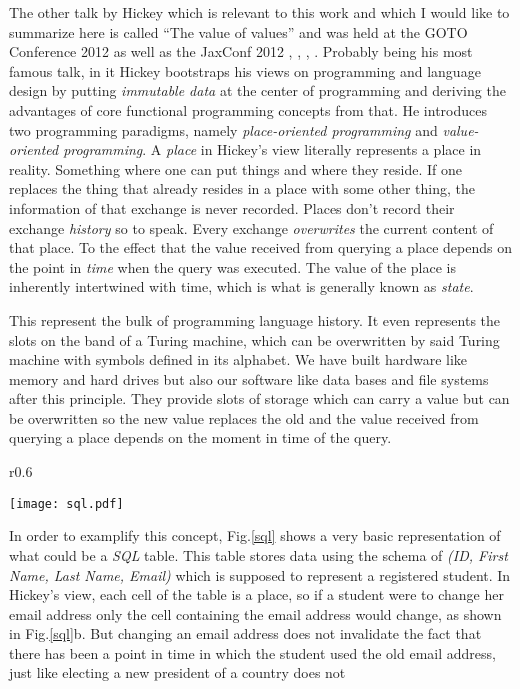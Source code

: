 The other talk by Hickey which is relevant to this work and which
I would like to summarize here is called ``The value of values''
and was held at the GOTO Conference 2012 as well as the JaxConf 2012
\cite{vofv-infoq}, \cite{vofv-yt}, \cite{goto2012}, \cite{jax2012}.
Probably being his most famous talk, in it Hickey bootstraps his
views on programming and language design by putting
\textit{immutable data} at the center of programming and deriving
the advantages of core functional programming concepts from that.
He introduces two programming paradigms,
namely \textit{place-oriented programming} and
\textit{value-oriented programming}. A \textit{place} in Hickey's
view literally represents a place in reality. Something where
one can put things and where they reside. If one replaces the thing
that already resides in a place with some other thing, the
information of that exchange is never recorded. Places don't
record their exchange \textit{history} so to speak. Every exchange
\textit{overwrites} the current content of that place.
To the effect that the value received from querying a place
depends on the point in \textit{time} when the query was executed.
The value of the place is inherently intertwined with time, which
is what is generally known as \textit{state}.

This represent the bulk of programming language history. It
even represents the slots on the band of a Turing machine, which
can be overwritten by said Turing machine with symbols defined in
its alphabet. We have built hardware like memory and hard drives
but also our software like data bases and file systems
after this principle. They provide slots of storage which can
carry a value but can be overwritten so the new value replaces the
old and the value received from querying a place depends on the
moment in time of the query.

\begin{wrapfigure}{r}{0.6\textwidth}

  \texttt{[image: sql.pdf]}
  \caption{Place-orientation examplified by a SQL table, each cell
           being a place.}
  \label{sql}

\end{wrapfigure}

In order to examplify this concept, Fig.\ref{sql} shows a very
basic representation of what could be a \textit{SQL} table.
This table stores data using the schema of \textit{(ID, First Name,
Last Name, Email)} which is supposed to represent a registered
student. In Hickey's view, each cell of the table is a place, so
if a student were to change her email address only the cell containing
the email address would change, as shown in Fig.\ref{sql}b.
But changing an email address does not invalidate the fact that
there has been a point in time in which the student used the
old email address, just like electing a new president of a country
does not




